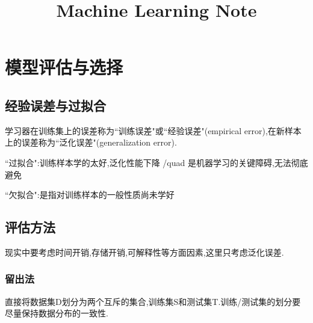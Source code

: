 \documentclass[12pt]{article}
\numberwithin{equation}{section}%
\begin{document}
\title{\vspace{-2em}Machine Learning Note\vspace{-0.7em}}
\author{}
\date{}
\maketitle\thispagestyle{fancy}
\maketitle
\tableofcontents 

\linespread{1.5} %


\section{模型评估与选择}

\subsection{经验误差与过拟合}

学习器在训练集上的误差称为``训练误差"或``经验误差"(empirical error),在新样本上的误差称为``泛化误差"(generalization error).

``过拟合":训练样本学的太好,泛化性能下降      /quad 是机器学习的关键障碍,无法彻底避免

``欠拟合":是指对训练样本的一般性质尚未学好

\subsection{评估方法}

现实中要考虑时间开销,存储开销,可解释性等方面因素,这里只考虑泛化误差.

\subsubsection{留出法}

直接将数据集D划分为两个互斥的集合,训练集S和测试集T.训练/测试集的划分要尽量保持数据分布的一致性.
\end{document}
